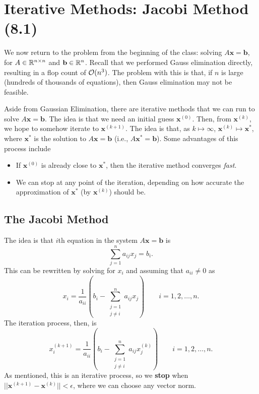 \documentclass[letterpaper]{article}
\newcommand{\0}{\mathbf{0}}
\renewcommand{\b}{\mathbf{b}}
\newcommand{\x}{\mathbf{x}}
\begin{document}
\section{Iterative Methods: Jacobi Method (8.1)}
We now return to the problem from the beginning of the class: solving $A\x = \b$, for $A \in \mathbb{R}^{n \times n}$ and $\b \in \R^n$. Recall that we performed Gauss elimination directly, resulting in a flop count of $\mathcal{O}(n^3)$. The problem with this is that, if $n$ is large (hundreds of thousands of equations), then Gauss elimination may not be feasible. 

\bigskip 

Aside from Gaussian Elimination, there are iterative methods that we can run to solve $A\x = \b$. The idea is that we need an initial guess $\x^{(0)}$. Then, from $\x^{(k)}$, we hope to somehow iterate to $\x^{(k + 1)}$. The idea is that, as $k \mapsto \infty$, $\x^{(k)} \mapsto \x^*$, where $\x^*$ is the solution to $A\x = \b$ (i.e., $A\x^* = \b$). Some advantages of this process include 
\begin{itemize}
    \item If $\x^{(0)}$ is already close to $\x^*$, then the iterative method converges \emph{fast}.
    \item We can stop at any point of the iteration, depending on how accurate the approximation of $\x^*$ (by $\x^{(k)}$) should be. 
\end{itemize}

\subsection{The Jacobi Method}
The idea is that $i$th equation in the system $A\x = \b$ is 
\[\sum_{j = 1}^{n} a_{ij}x_j = b_i.\]
This can be rewritten by solving for $x_i$ and assuming that $a_{ii} \neq 0$ as 
\[x_i = \frac{1}{a_{ii}}\left(b_{i} - \sum_{\substack{j = 1 \\ j \neq i}}^n a_{ij}x_{j}\right) \qquad i = 1, 2, \hdots, n.\]
The iteration process, then, is 
\[\boxed{x_{i}^{(k + 1)} = \frac{1}{a_{ii}} \left(b_{i} - \sum_{\substack{j = 1 \\ j \neq i}}^n a_{ij}x_{j}^{(k)}\right)} \qquad i = 1, 2, \hdots, n.\]
As mentioned, this is an iterative process, so we \textbf{stop} when $||\x^{(k + 1)} - \x^{(k)}|| < \epsilon$, where we can choose any vector norm. 
\end{document}

